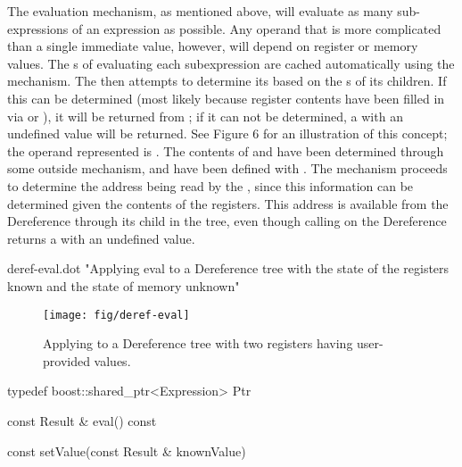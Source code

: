 The evaluation mechanism, as mentioned above, will evaluate as many
sub-\/expressions of an expression as possible. Any operand that is more
complicated than a single immediate value, however, will depend on register or
memory values. The s of evaluating each subexpression are cached
automatically using the  mechanism. The  then attempts
to determine its  based on the s of its children. If this  can
be determined (most likely because register contents have been filled in via
 or ), it will be returned from ; if it can
not be determined, a  with an undefined value will be returned. See Figure
6 for an illustration of this concept; the operand represented is 
. 
The contents of  and  have been determined through some
outside mechanism, and have been defined with . The 
mechanism proceeds to determine the address being read by the , since
this information can be determined given the contents of the registers. This
address is available from the Dereference through its child in the tree, even
though calling  on the Dereference returns a  with an
undefined value.

\dotfile deref-eval.dot
"Applying eval to a Dereference tree with the state of the registers known and the state of memory unknown"

\begin{figure}
    \centering
\texttt{[image: fig/deref-eval]}
\caption{Applying  to a Dereference tree with two registers
having user-provided values.}
\label{fig:deref-eval}
\end{figure}

\begin{apient}
typedef boost::shared_ptr<Expression> Ptr
\end{apient}

\begin{apient}
const Result & eval() const
\end{apient}

\begin{apient}
const setValue(const Result & knownValue)
\end{apient}

